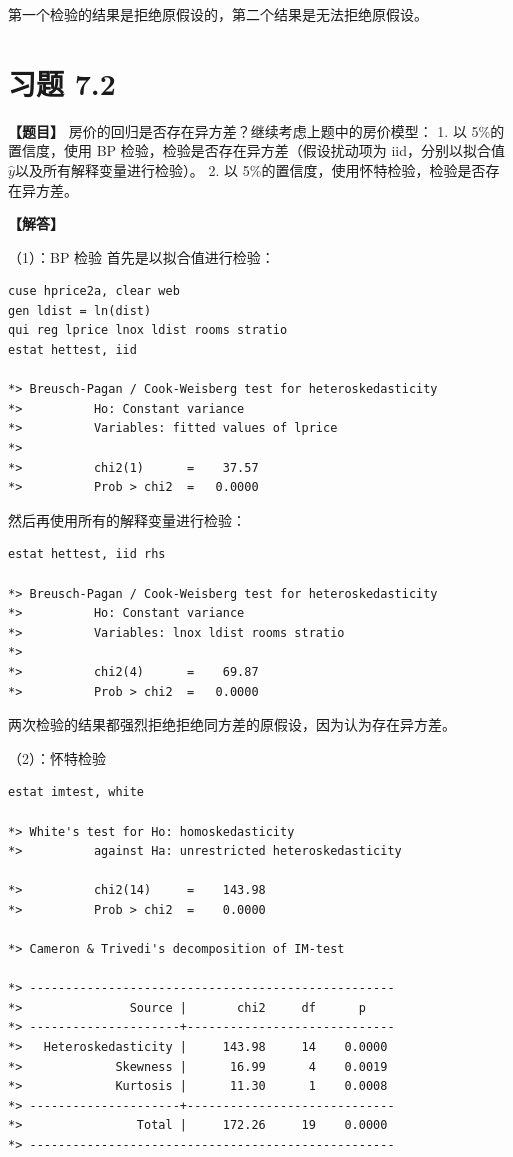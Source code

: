 \documentclass[cn,fancy,blue,11pt]{elegantbook}
\begin{document}
第一个检验的结果是拒绝原假设的，第二个结果是无法拒绝原假设。


\hypertarget{section-46}{%
\section{习题 7.2}\label{section-46}}

\textbf{【题目】}
房价的回归是否存在异方差？继续考虑上题中的房价模型：
1. 以 5\%的置信度，使用 BP 检验，检验是否存在异方差（假设扰动项为 iid，分别以拟合值\(\hat{y}以及所有解释变量进行检验\)）。
2. 以 5\%的置信度，使用怀特检验，检验是否存在异方差。

\textbf{【解答】}

（1）：BP 检验
首先是以拟合值进行检验：

\begin{lstlisting}
cuse hprice2a, clear web
gen ldist = ln(dist)
qui reg lprice lnox ldist rooms stratio
estat hettest, iid

*> Breusch-Pagan / Cook-Weisberg test for heteroskedasticity
*>          Ho: Constant variance
*>          Variables: fitted values of lprice
*>
*>          chi2(1)      =    37.57
*>          Prob > chi2  =   0.0000
\end{lstlisting}

然后再使用所有的解释变量进行检验：

\begin{lstlisting}
estat hettest, iid rhs

*> Breusch-Pagan / Cook-Weisberg test for heteroskedasticity
*>          Ho: Constant variance
*>          Variables: lnox ldist rooms stratio
*>
*>          chi2(4)      =    69.87
*>          Prob > chi2  =   0.0000
\end{lstlisting}

两次检验的结果都强烈拒绝拒绝同方差的原假设，因为认为存在异方差。

（2）：怀特检验

\begin{lstlisting}
estat imtest, white

*> White's test for Ho: homoskedasticity
*>          against Ha: unrestricted heteroskedasticity

*>          chi2(14)     =    143.98
*>          Prob > chi2  =    0.0000

*> Cameron & Trivedi's decomposition of IM-test

*> ---------------------------------------------------
*>               Source |       chi2     df      p
*> ---------------------+-----------------------------
*>   Heteroskedasticity |     143.98     14    0.0000
*>             Skewness |      16.99      4    0.0019
*>             Kurtosis |      11.30      1    0.0008
*> ---------------------+-----------------------------
*>                Total |     172.26     19    0.0000
*> ---------------------------------------------------
\end{lstlisting}
\end{document}
